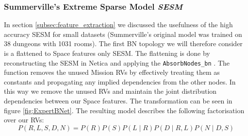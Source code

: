 \documentclass{UoYCSproject}
\begin{document}
\subsubsection{Summerville's Extreme Sparse Model \textit{SESM}}
In section \ref{subsec:feature_extraction} we discussed the usefulness of the high accuracy SESM for small datasets (Summerville's original model was trained on 38 dungeons with 1031 rooms). The first BN topology we will therefore consider is a flattened to Space features only SESM. The flattening is done by reconstructing the SESM in Netica and applying the \texttt{AbsorbNodes\_bn} \parencite[62-63]{neticaCman}. The function removes the unused Mission RVs by effectively treating them as constants and propagating any implied dependencies from the other nodes. In this way we remove the unused RVs and maintain the joint distribution dependencies between our Space features. The transformation can be seen in figure \ref{fig:ExpertBNet}. The resulting model describes the following factorisation over our RVs:
\begin{equation}
  \label{eq:SESM}
  P(R,L,S,D,N) = P(R)P(S)P(L \mid R)P(D \mid R, L)P(N \mid D, S)
\end{equation}
\end{document}

